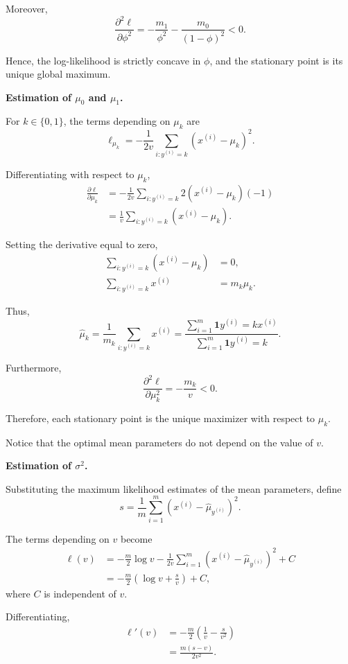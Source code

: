\documentclass[10pt]{article}
\newcommand{\ind}{\mathbf{1}}
\begin{document}
\begin{enumerate}
\begin{enumerate}[label=(\alph*)]
Moreover,
\[
\frac{\partial^2\ell}{\partial\phi^2}
=
-\frac{m_1}{\phi^2}
-
\frac{m_0}{(1-\phi)^2}
<0.
\]

Hence, the log-likelihood is strictly concave
in $\phi$, and the stationary point is its
unique global maximum.

\medskip
\noindent\colorbox{blue!20}{\textbf{Estimation of $\mu_0$ and $\mu_1$.}}

For $k\in\{0,1\}$, the terms depending on
$\mu_k$ are
\[
\ell_{\mu_k}
=
-\frac{1}{2v}
\sum_{i:y^{(i)}=k}
(x^{(i)}-\mu_k)^2.
\]

Differentiating with respect to $\mu_k$,
\[
\begin{aligned}
\frac{\partial\ell}{\partial\mu_k}
&=
-\frac{1}{2v}
\sum_{i:y^{(i)}=k}
2(x^{(i)}-\mu_k)(-1)
\\[4pt]
&=
\frac{1}{v}
\sum_{i:y^{(i)}=k}
(x^{(i)}-\mu_k).
\end{aligned}
\]

Setting the derivative equal to zero,
\[
\begin{aligned}
\sum_{i:y^{(i)}=k}
(x^{(i)}-\mu_k)
&=0,
\\[4pt]
\sum_{i:y^{(i)}=k}x^{(i)}
&=m_k\mu_k.
\end{aligned}
\]

Thus,
\[
\boxed{
\hat{\mu}_k
=
\frac{1}{m_k}
\sum_{i:y^{(i)}=k}x^{(i)}
=
\frac{
\sum_{i=1}^{m}
\ind{y^{(i)}=k}x^{(i)}
}{
\sum_{i=1}^{m}
\ind{y^{(i)}=k}
}.
}
\]

Furthermore,
\[
\frac{\partial^2\ell}{\partial\mu_k^2}
=
-\frac{m_k}{v}<0.
\]

Therefore, each stationary point is the
unique maximizer with respect to $\mu_k$.

Notice that the optimal mean parameters do
not depend on the value of $v$.

\medskip
\noindent\colorbox{blue!20}{\textbf{Estimation of $\sigma^2$.}}


Substituting the maximum likelihood estimates
of the mean parameters, define
\[
s
=
\frac{1}{m}
\sum_{i=1}^{m}
(x^{(i)}-\hat{\mu}_{y^{(i)}})^2.
\]

The terms depending on $v$ become
\[
\begin{aligned}
\ell(v)
&=
-\frac{m}{2}\log v
-
\frac{1}{2v}
\sum_{i=1}^{m}
(x^{(i)}-\hat{\mu}_{y^{(i)}})^2
+C
\\[4pt]
&=
-\frac{m}{2}
\left(
\log v+\frac{s}{v}
\right)+C,
\end{aligned}
\]
where $C$ is independent of $v$.

Differentiating,
\[
\begin{aligned}
\ell'(v)
&=
-\frac{m}{2}
\left(
\frac{1}{v}-\frac{s}{v^2}
\right)
\\[4pt]
&=
\frac{m(s-v)}{2v^2}.
\end{aligned}
\]


\end{enumerate}
\end{enumerate}
\end{document}
